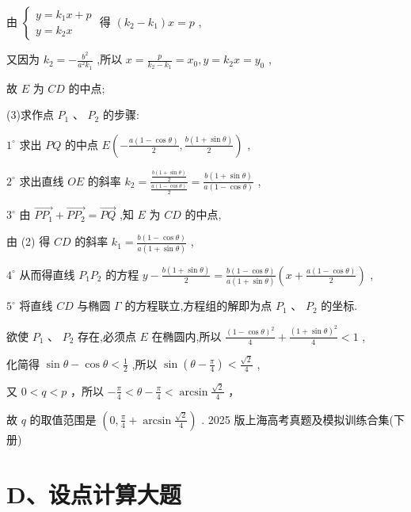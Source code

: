 \documentclass[10pt]{article}
\begin{document}
由 \(\left\{  \begin{array}{l} y = {k}_{1}x + p \\  y = {k}_{2}x \end{array}\right.\) 得 \(\left( {{k}_{2} - {k}_{1}}\right) x = p\) ,

又因为 \({k}_{2} =  - \frac{{b}^{2}}{{a}^{2}{k}_{1}}\) ,所以 \(x = \frac{p}{{k}_{2} - {k}_{1}} = {x}_{0},y = {k}_{2}x = {y}_{0}\) ,

故 \(E\) 为 \({CD}\) 的中点;

(3)求作点 \({P}_{1}\) 、 \({P}_{2}\) 的步骤:

\({1}^{ \circ  }\) 求出 \({PQ}\) 的中点 \(E\left( {-\frac{a\left( {1 - \cos \theta }\right) }{2},\frac{b\left( {1 + \sin \theta }\right) }{2}}\right)\) ,

\({2}^{ \circ  }\) 求出直线 \({OE}\) 的斜率 \({k}_{2} = \frac{\frac{b\left( {1 + \sin \theta }\right) }{2}}{\frac{a\left( {1 - \cos \theta }\right) }{2}} = \frac{b\left( {1 + \sin \theta }\right) }{a\left( {1 - \cos \theta }\right) }\) ,

\({3}^{ \circ  }\) 由 \(\overrightarrow{P{P}_{1}} + \overrightarrow{P{P}_{2}} = \overrightarrow{PQ}\) ,知 \(E\) 为 \({CD}\) 的中点,

由 (2) 得 \({CD}\) 的斜率 \({k}_{1} = \frac{b\left( {1 - \cos \theta }\right) }{a\left( {1 + \sin \theta }\right) }\) ,

\({4}^{ \circ  }\) 从而得直线 \({P}_{1}{P}_{2}\) 的方程 \(y - \frac{b\left( {1 + \sin \theta }\right) }{2} = \frac{b\left( {1 - \cos \theta }\right) }{a\left( {1 + \sin \theta }\right) }\left( {x + \frac{a\left( {1 - \cos \theta }\right) }{2}}\right)\) ,

\({5}^{ \circ  }\) 将直线 \({CD}\) 与椭圆 \(\Gamma\) 的方程联立,方程组的解即为点 \({P}_{1}\text{ 、 }{P}_{2}\) 的坐标.

欲使 \({P}_{1}\text{ 、 }{P}_{2}\) 存在,必须点 \(E\) 在椭圆内,所以 \(\frac{{\left( 1 - \cos \theta \right) }^{2}}{4} + \frac{{\left( 1 + \sin \theta \right) }^{2}}{4} < 1\) ,

化简得 \(\sin \theta  - \cos \theta  < \frac{1}{2}\) ,所以 \(\sin \left( {\theta  - \frac{\pi }{4}}\right)  < \frac{\sqrt{2}}{4}\) ,

又 \(0 < q < p\) ，所以 \(- \frac{\pi }{4} < \theta  - \frac{\pi }{4} < \arcsin \frac{\sqrt{2}}{4}\) ，

故 \(q\) 的取值范围是 \(\left( {0,\frac{\pi }{4} + \arcsin \frac{\sqrt{2}}{4}}\right)\) . 2025 版上海高考真题及模拟训练合集(下册)

\section*{D、设点计算大题}
\end{document}
